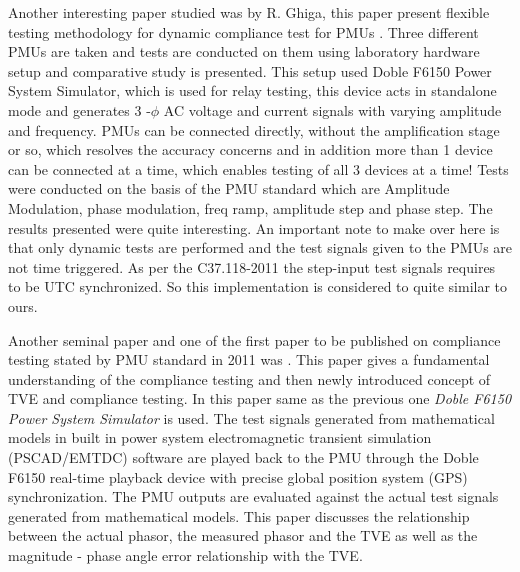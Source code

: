 Another interesting paper studied was by R. Ghiga, this paper present flexible testing methodology for dynamic compliance test for PMUs \cite{Paper:ghiga}. Three different PMUs are taken and tests are conducted on them using laboratory hardware setup and comparative study is presented. This setup used Doble F6150 Power System Simulator, which is used for relay testing, this device acts in standalone mode and generates 3 -$\phi$ AC voltage and current signals with varying amplitude and frequency. PMUs can be connected directly, without the amplification stage or so, which resolves the accuracy concerns and in addition more than 1 device can be connected at a time, which enables testing of all 3 devices at a time! Tests were conducted on the basis of the PMU standard which are Amplitude Modulation, phase modulation, freq ramp, amplitude step and phase step. The results presented were quite interesting. An important note to make over here is that only dynamic tests are performed and the test signals given to the PMUs are not time triggered. As per the C37.118-2011 the step-input test signals requires to be UTC synchronized. So this implementation is considered to quite similar to ours.

Another seminal paper and one of the first paper to be published on compliance testing stated by PMU standard in 2011 was \cite{paper:nrendra}. This paper gives a fundamental understanding of the compliance testing and then newly introduced concept of TVE and compliance testing. In this paper same as the previous one \textit{Doble F6150 Power System Simulator} is used.  The test signals generated from mathematical models in built in power system electromagnetic transient simulation (PSCAD/EMTDC) software are played back to the PMU through the Doble F6150 real-time playback device with precise global position system (GPS) synchronization. The PMU outputs are evaluated against the actual test signals generated from mathematical models. This paper discusses the relationship between the actual phasor, the measured phasor and the TVE as well as the magnitude - phase angle error relationship with the TVE.

